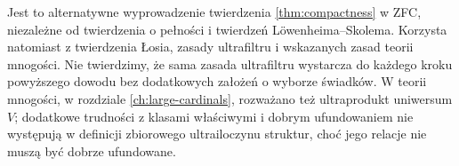 \begin{uwaga}
\label{rem:mod-ultra-compactness-scope}
Jest to alternatywne wyprowadzenie twierdzenia \ref{thm:compactness}
w ZFC, niezależne od twierdzenia o pełności i twierdzeń
Löwenheima--Skolema. Korzysta natomiast z twierdzenia Łosia,
zasady ultrafiltru i wskazanych zasad teorii mnogości.
Nie twierdzimy, że sama zasada ultrafiltru wystarcza do
każdego kroku powyższego dowodu bez dodatkowych założeń
o wyborze świadków. W teorii mnogości, w rozdziale \ref{ch:large-cardinals},
rozważano też ultraprodukt uniwersum $V$; dodatkowe trudności
z klasami właściwymi i dobrym ufundowaniem nie występują w
definicji zbiorowego ultrailoczynu struktur, choć jego relacje
nie muszą być dobrze ufundowane.
\end{uwaga}
